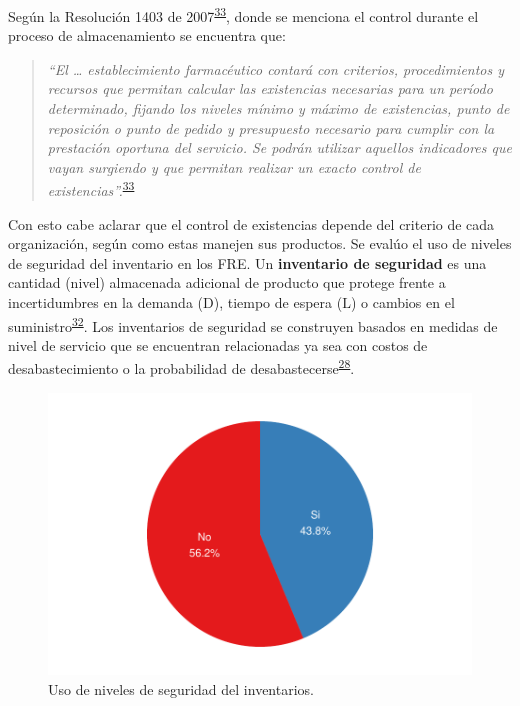 \documentclass[
]{book}
\begin{document}
Según la Resolución 1403 de 2007\textsuperscript{\protect\hyperlink{ref-MinisteriodeSaludyProteccionSocial2007}{33}}, donde se menciona el control durante el proceso de almacenamiento se encuentra que:

\begin{quote}
\emph{``El \ldots{} establecimiento farmacéutico contará con criterios, procedimientos y recursos que permitan calcular las existencias necesarias para un período determinado, fijando los niveles mínimo y máximo de existencias, punto de reposición o punto de pedido y presupuesto necesario para cumplir con la prestación oportuna del servicio. Se podrán utilizar aquellos indicadores que vayan surgiendo y que permitan realizar un exacto control de existencias''.}\textsuperscript{\protect\hyperlink{ref-MinisteriodeSaludyProteccionSocial2007}{33}}
\end{quote}

Con esto cabe aclarar que el control de existencias depende del criterio de cada organización, según como estas manejen sus productos. Se evalúo el uso de niveles de seguridad del inventario en los FRE. Un \textbf{inventario de seguridad} es una cantidad (nivel) almacenada adicional de producto que protege frente a incertidumbres en la demanda (\(\mathrm{D}\)), tiempo de espera (\(\mathrm{L}\)) o cambios en el suministro\textsuperscript{\protect\hyperlink{ref-Krajewski2016}{32}}. Los inventarios de seguridad se construyen basados en medidas de nivel de servicio que se encuentran relacionadas ya sea con costos de desabastecimiento o la probabilidad de desabastecerse\textsuperscript{\protect\hyperlink{ref-Silver2017}{28}}.

\begin{figure}

{\centering \includegraphics[width=0.78\linewidth]{InformeFinal_files/figure-latex/UsoNivelesSeguridad-1} 

}

\caption{Uso de niveles de seguridad del inventarios.}\label{fig:UsoNivelesSeguridad}
\end{figure}
\end{document}

